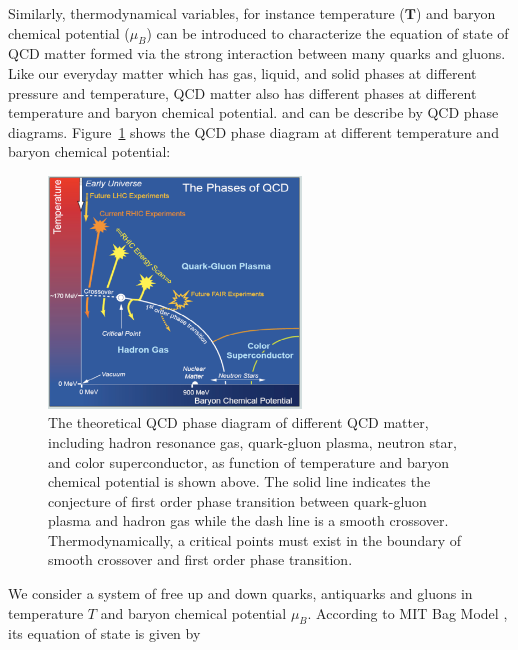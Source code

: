  
 \fi
Similarly, thermodynamical variables, for instance temperature ($\mathbf{T}$) and baryon chemical potential ($\mu_{B}$) can be introduced to characterize the equation of state of QCD matter formed via the strong interaction between many quarks and gluons. %
Like our everyday matter which has gas, liquid, and solid phases at different pressure and temperature, QCD matter also has different phases at different temperature and baryon chemical potential. and can be describe by QCD phase diagrams. Figure~\ref{QCDPhaseDiagram} shows the QCD phase diagram at different temperature and baryon chemical potential:

\begin{figure}[hbtp]
\begin{center}
\includegraphics[width=0.60\textwidth]{Figures/Chapter1/QCDPhaseDiagram.png}
\caption{The theoretical QCD phase diagram of different QCD matter, including hadron resonance gas, quark-gluon plasma, neutron star, and color superconductor, as function of temperature and baryon chemical potential is shown above. The solid line indicates the conjecture of first order phase transition between quark-gluon plasma and hadron gas while the dash line is a smooth crossover. Thermodynamically, a critical points must exist in the boundary of smooth crossover and first order phase transition.}
\label{QCDPhaseDiagram}
\end{center}
\end{figure} 

We consider a system of free up and down quarks, antiquarks and gluons in temperature $T$ and baryon chemical potential $\mu_B$. According to MIT Bag Model \cite{MITBag}, its equation of state is given by

